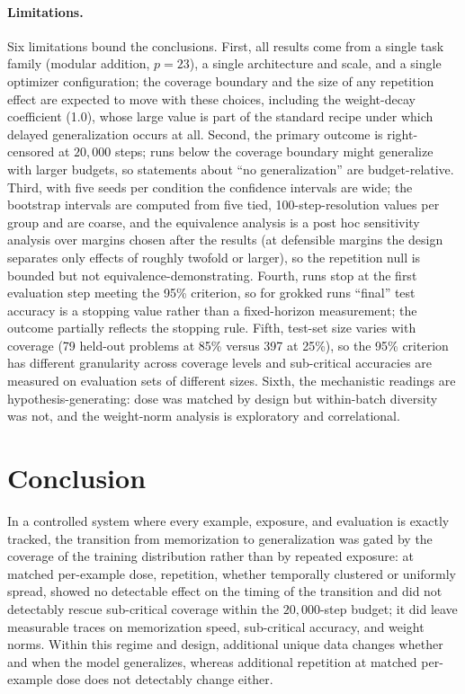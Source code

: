 \documentclass[10pt]{article}
\begin{document}
\paragraph{Limitations.}
Six limitations bound the conclusions. First, all results come from a single task family (modular addition, $p=23$), a single architecture and scale, and a single optimizer configuration; the coverage boundary and the size of any repetition effect are expected to move with these choices, including the weight-decay coefficient (1.0), whose large value is part of the standard recipe under which delayed generalization occurs at all. Second, the primary outcome is right-censored at $20{,}000$ steps; runs below the coverage boundary might generalize with larger budgets, so statements about ``no generalization'' are budget-relative. Third, with five seeds per condition the confidence intervals are wide; the bootstrap intervals are computed from five tied, 100-step-resolution values per group and are coarse, and the equivalence analysis is a post hoc sensitivity analysis over margins chosen after the results (at defensible margins the design separates only effects of roughly twofold or larger), so the repetition null is bounded but not equivalence-demonstrating. Fourth, runs stop at the first evaluation step meeting the 95\% criterion, so for grokked runs ``final'' test accuracy is a stopping value rather than a fixed-horizon measurement; the outcome partially reflects the stopping rule. Fifth, test-set size varies with coverage (79 held-out problems at 85\% versus 397 at 25\%), so the 95\% criterion has different granularity across coverage levels and sub-critical accuracies are measured on evaluation sets of different sizes. Sixth, the mechanistic readings are hypothesis-generating: dose was matched by design but within-batch diversity was not, and the weight-norm analysis is exploratory and correlational.

\section{Conclusion}

In a controlled system where every example, exposure, and evaluation is exactly tracked, the transition from memorization to generalization was gated by the coverage of the training distribution rather than by repeated exposure: at matched per-example dose, repetition, whether temporally clustered or uniformly spread, showed no detectable effect on the timing of the transition and did not detectably rescue sub-critical coverage within the $20{,}000$-step budget; it did leave measurable traces on memorization speed, sub-critical accuracy, and weight norms. Within this regime and design, additional unique data changes whether and when the model generalizes, whereas additional repetition at matched per-example dose does not detectably change either.
\end{document}
